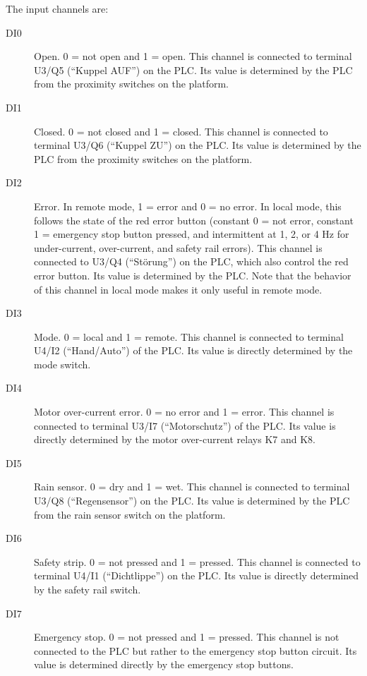 The input channels are:
\begin{description}
\item[DI0] Open. 0 = not open and 1 = open. This channel is connected to terminal U3/Q5 (“Kuppel AUF”) on the PLC. Its value is determined by the PLC from the proximity switches on the platform.
\item[DI1] Closed. 0 = not closed and 1 = closed. This channel is connected to terminal U3/Q6 (“Kuppel ZU”) on the PLC. Its value is determined by the PLC from the proximity switches on the platform.
\item[DI2] Error. In remote mode, 1 = error and 0 = no error. In local mode, this follows the state of the red error button (constant 0 = not error, constant 1 = emergency stop button pressed, and intermittent at 1, 2, or 4 Hz for under-current, over-current, and safety rail errors). This channel is connected to U3/Q4 (“Störung”) on the PLC, which also control the red error button. Its value is determined by the PLC. Note that the behavior of this channel in local mode makes it only useful in remote mode.
\item[DI3] Mode. 0 = local and 1 = remote. This channel is connected to terminal U4/I2 (“Hand/Auto”) of the PLC. Its value is directly determined by the mode switch. 
\item[DI4] Motor over-current error. 0 = no error and 1 = error. This channel is connected to terminal U3/I7 (“Motorschutz”) of the PLC. Its value is directly determined by the motor over-current relays K7 and K8.
\item[DI5] Rain sensor. 0 = dry and 1 = wet. This channel is connected to terminal U3/Q8 (“Regensensor”) on the PLC. Its value is determined by the PLC from the rain sensor switch on the platform. 
\item[DI6] Safety strip. 0 = not pressed and 1 = pressed. This channel is connected to terminal U4/I1 (“Dichtlippe”) on the PLC. Its value is directly determined by the safety rail switch.
\item[DI7] Emergency stop. 0 = not pressed and 1 = pressed. This channel is not connected to the PLC but rather to the emergency stop button circuit. Its value is determined directly by the emergency stop buttons.
\end{description}

